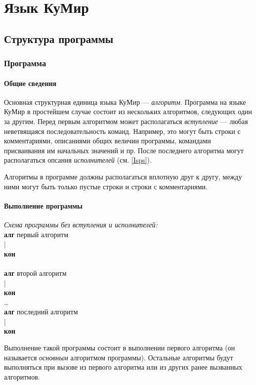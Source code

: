 \chapter{Язык КуМир}

\section{Структура программы}

\subsection{Программа}

\subsubsection{Общие сведения}
	Основная структурная единица языка КуМир --- \emph{алгоритм}. Программа на языке КуМир в простейшем случае состоит из нескольких алгоритмов, следующих один за другим. Перед первым алгоритмом может располагаться \emph{вступление} --- любая неветвящаяся последовательность команд. Например, это могут быть строки с комментариями, описаниями общих величин программы, командами присваивания им начальных значений и пр. После последнего алгоритма могут располагаться опсания \emph{исполнителей} (см. \ref{Isps}).
	
Алгоритмы в программе должны располагаться вплотную друг к другу, между ними могут быть только пустые строки и строки с комментариями.

\subsubsection{Выполнение программы}

\emph{Схема программы без вступления и исполнителей:}
{\sffamily\\
\textbf{алг} первый алгоритм\\
|\\
\textbf{кон}\\
~\\
\textbf{алг} второй алгоритм\\
|\\
\textbf{кон}\\
\dots\\
\textbf{алг} последний алгоритм\\
|\\
\textbf{кон}
}

Выполнение такой программы состоит в выполнении первого алгоритма (он называется \emph{основным} алгоритмом программы). Остальные алгоритмы будут выполняться при вызове из первого алгоритма или из других ранее вызванных алгоритмов.

